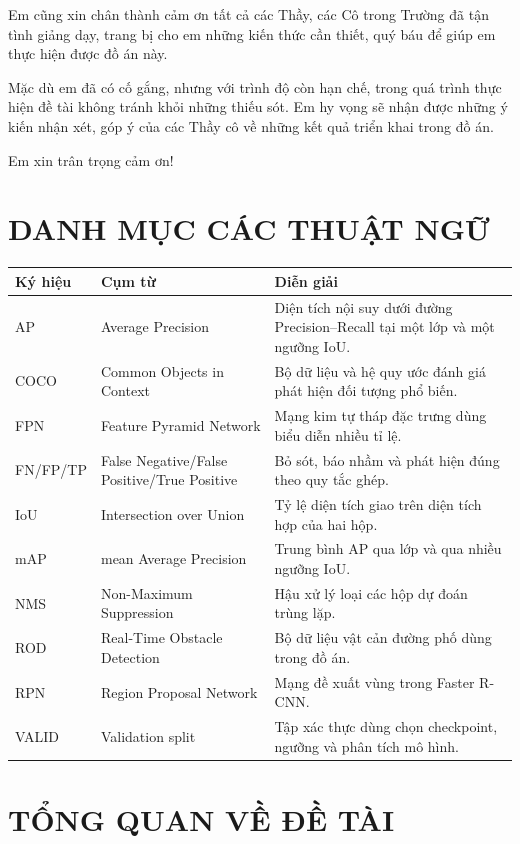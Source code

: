 \documentclass[12pt,a4paper,oneside]{report}
\begin{document}
Em cũng xin chân thành cảm ơn tất cả các Thầy, các Cô trong Trường đã tận tình giảng dạy, trang bị cho em những kiến thức cần thiết, quý báu để giúp em thực hiện được đồ án này.

Mặc dù em đã có cố gắng, nhưng với trình độ còn hạn chế, trong quá trình thực hiện đề tài không tránh khỏi những thiếu sót. Em hy vọng sẽ nhận được những ý kiến nhận xét, góp ý của các Thầy cô về những kết quả triển khai trong đồ án.

Em xin trân trọng cảm ơn!

\clearpage
\tableofcontents
\clearpage
\chapter*{DANH MỤC CÁC THUẬT NGỮ}
\begin{longtable}{p{2.4cm}p{4.6cm}p{7.2cm}}
\toprule Ký hiệu & Cụm từ & Diễn giải\\\midrule
AP & Average Precision & Diện tích nội suy dưới đường Precision--Recall tại một lớp và một ngưỡng IoU.\\
COCO & Common Objects in Context & Bộ dữ liệu và hệ quy ước đánh giá phát hiện đối tượng phổ biến.\\
FPN & Feature Pyramid Network & Mạng kim tự tháp đặc trưng dùng biểu diễn nhiều tỉ lệ.\\
FN/FP/TP & False Negative/False Positive/True Positive & Bỏ sót, báo nhầm và phát hiện đúng theo quy tắc ghép.\\
IoU & Intersection over Union & Tỷ lệ diện tích giao trên diện tích hợp của hai hộp.\\
mAP & mean Average Precision & Trung bình AP qua lớp và qua nhiều ngưỡng IoU.\\
NMS & Non-Maximum Suppression & Hậu xử lý loại các hộp dự đoán trùng lặp.\\
ROD & Real-Time Obstacle Detection & Bộ dữ liệu vật cản đường phố dùng trong đồ án.\\
RPN & Region Proposal Network & Mạng đề xuất vùng trong Faster R-CNN.\\
VALID & Validation split & Tập xác thực dùng chọn checkpoint, ngưỡng và phân tích mô hình.\\
\bottomrule
\end{longtable}\clearpage
\listoftables
\clearpage
\listoffigures
\clearpage
\chapter{TỔNG QUAN VỀ ĐỀ TÀI}\label{chap:intro}
\end{document}
